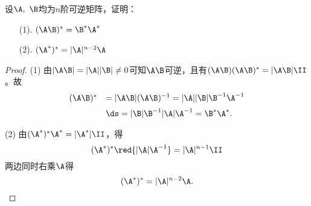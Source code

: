 \begin{li}
  设$\A,~\B$均为$n$阶可逆矩阵，证明：
  \begin{itemize}
  \item[(1).] $(\A\B)^*=\B^*\A^*$
  \item[(2).] $(\A^*)^*=|\A|^{n-2}\A$ 
  \end{itemize}
\end{li}
\begin{proof}

(1) 由$|\A\B| = |\A||\B| \ne 0$可知$\A\B$可逆，且有$(\A\B)(\A\B)^*=|\A\B|\II$。故
$$
\begin{array}{cl}
  (\A\B)^* &  =|\A\B| (\A\B)^{-1}
             = |\A||\B| \B^{-1}\A^{-1} \\[0.2cm]
           & \ds = |\B| \B^{-1} |\A| \A^{-1}   = \B^*\A^*.      
\end{array}
$$


(2) 由$(\A^*)^* \A^* = |\A^*|\II$，得 
$$(\A^*)^* \red{|\A|\A^{-1}} = |\A|^{n-1}\II$$  
两边同时右乘$\A$得
$$
(\A^*)^*=|\A|^{n-2}\A.
$$
\end{proof}

